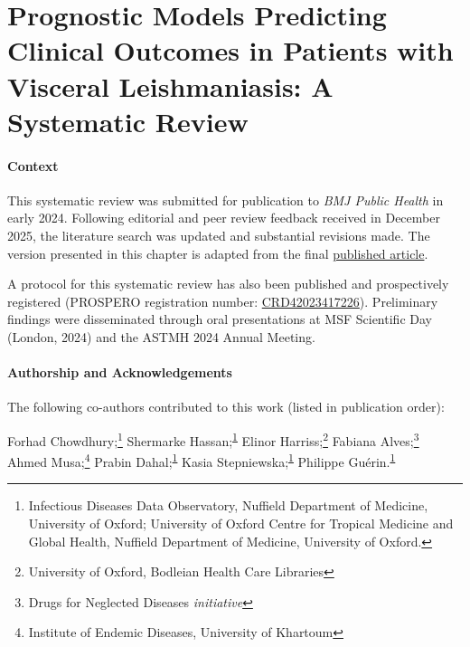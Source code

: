 
\chapter[Systematic Review of Prognostic Models]{\label{ch:3-sys-review}Prognostic Models Predicting Clinical Outcomes in Patients with Visceral Leishmaniasis: A Systematic Review}
\minitoc{}

\subsubsection{Context}

This systematic review was submitted for publication to \textit{BMJ Public Health} in early 2024. Following editorial and peer review feedback received in December 2025, the literature search was updated and substantial revisions made. The version presented in this chapter is adapted from the final \href{https://doi.org/10.1136/bmjph-2024-001196}{published article}\cite{wilson2026}.

A protocol for this systematic review has also been published\cite{wilsonPrognosticPredictionModels2023} and prospectively registered (PROSPERO registration number: \href{https://www.crd.york.ac.uk/PROSPERO/view/CRD42021284622}{CRD42023417226}). Preliminary findings were disseminated through oral presentations at MSF Scientific Day (London, 2024) and the ASTMH 2024 Annual Meeting.

\subsubsection{Authorship and Acknowledgements}

The following co-authors contributed to this work (listed in publication order):

Forhad Chowdhury;\footnote{Infectious Diseases Data Observatory, Nuffield Department of Medicine, University of Oxford; University of Oxford Centre for Tropical Medicine and Global Health, Nuffield Department of Medicine, University of Oxford.\label{fn:IDDO}} Shermarke Hassan;\textsuperscript{\ref{fn:IDDO}} Elinor Harriss;\footnote{University of Oxford, Bodleian Health Care Libraries} Fabiana Alves;\footnote{Drugs for Neglected Diseases \textit{initiative}} Ahmed Musa;\footnote{Institute of Endemic Diseases, University of Khartoum} Prabin Dahal;\textsuperscript{\ref{fn:IDDO}} Kasia Stepniewska;\textsuperscript{\ref{fn:IDDO}} Philippe Guérin.\textsuperscript{\ref{fn:IDDO}}

